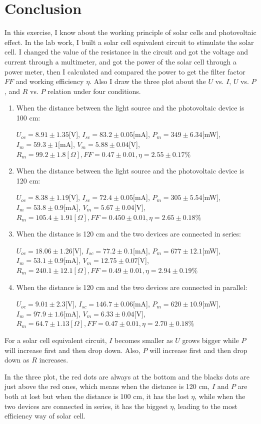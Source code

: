 \documentclass[12pt]{article}
\begin{document}
\section{Conclusion}
In this exercise, I know about the working principle of solar cells and photovoltaic effect. In the lab work, I built a solar cell equivalent circuit to stimulate the solar cell. I changed the value of the resistance in the circuit and got the voltage and current through a multimeter, and got the power of the solar cell through a power meter, then I calculated and compared the power to get the filter factor $FF$ and working efficiency $\eta$. Also I draw the three plot about the $U$ vs. $I$, $U$ vs. $P$, and $R$ vs. $P$ relation under four conditions.
\begin{enumerate}
\item When the distance between the light source and the photovoltaic device is 100 cm:
\par$U_{oc}=8.91\pm1.35$[V], $I_{sc}=83.2\pm0.05$[mA], $P_m=349\pm6.34$[mW], $I_m=59.3\pm1$[mA], $V_m=5.88\pm0.04$[V], $R_m=99.2\pm1.8[\Omega],FF=0.47\pm0.01,\eta=2.55\pm0.17\%$
\item When the distance between the light source and the photovoltaic device is 120 cm:
\par$U_{oc}=8.38\pm1.19$[V], $I_{sc}=72.4\pm0.05$[mA], $P_m=305\pm5.54$[mW], $I_m=53.8\pm0.9$[mA], $V_m=5.67\pm0.04$[V], $R_m=105.4\pm1.91[\Omega],FF=0.450\pm0.01,\eta=2.65\pm0.18\%$
\item When the distance is 120 cm and the two devices are connected in series:
\par$U_{oc}=18.06\pm1.26$[V], $I_{sc}=77.2\pm0.1$[mA], $P_m=677\pm12.1$[mW], $I_m=53.1\pm0.9$[mA], $V_m=12.75\pm0.07$[V], $R_m=240.1\pm12.1[\Omega],FF=0.49\pm0.01,\eta=2.94\pm0.19\%$
\item When the distance is 120 cm and the two devices are connected in parallel:
\par$U_{oc}=9.01\pm2.3$[V], $I_{sc}=146.7\pm0.06$[mA], $P_m=620\pm10.9$[mW], $I_m=97.9\pm1.6$[mA], $V_m=6.33\pm0.04$[V], $R_m=64.7\pm1.13[\Omega],FF=0.47\pm0.01,\eta=2.70\pm0.18\%$
\end{enumerate}
\par For a solar cell equivalent circuit, $I$ becomes smaller as $U$ grows bigger while $P$ will increase first and then drop down. Also, $P$ will increase first and then drop down as $R$ increases.
\par In the three plot, the red dots are always at the bottom and the blacks dots are just above the red ones, which means when the distance is 120 cm, $I$ and $P$ are both at lost but when the distance is 100 cm, it has the lost $\eta$, while when the two devices are connected in series, it has the biggest $\eta$, leading to the most efficiency way of solar cell.
\end{document}
